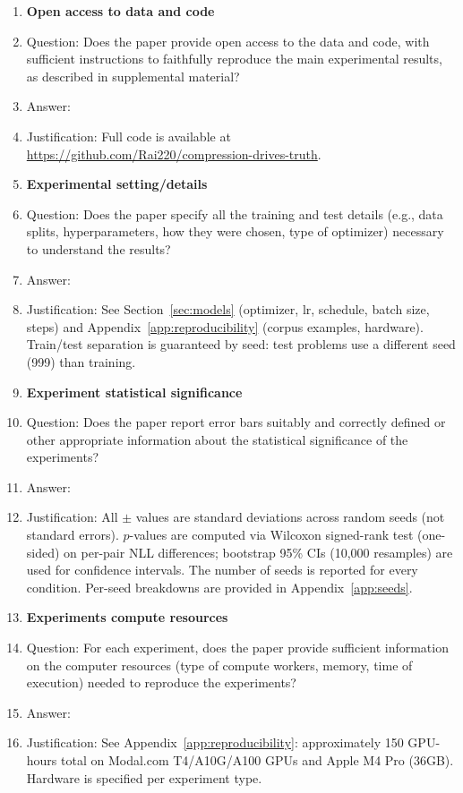 \documentclass{article}
\begin{document}
\begin{enumerate}
\item {\bf Open access to data and code}
    \item[] Question: Does the paper provide open access to the data and code, with sufficient instructions to faithfully reproduce the main experimental results, as described in supplemental material?
    \item[] Answer: \answerYes{}
    \item[] Justification: Full code is available at \url{https://github.com/Rai220/compression-drives-truth}.

\item {\bf Experimental setting/details}
    \item[] Question: Does the paper specify all the training and test details (e.g., data splits, hyperparameters, how they were chosen, type of optimizer) necessary to understand the results?
    \item[] Answer: \answerYes{}
    \item[] Justification: See Section~\ref{sec:models} (optimizer, lr, schedule, batch size, steps) and Appendix~\ref{app:reproducibility} (corpus examples, hardware). Train/test separation is guaranteed by seed: test problems use a different seed (999) than training.

\item {\bf Experiment statistical significance}
    \item[] Question: Does the paper report error bars suitably and correctly defined or other appropriate information about the statistical significance of the experiments?
    \item[] Answer: \answerYes{}
    \item[] Justification: All $\pm$ values are standard deviations across random seeds (not standard errors). $p$-values are computed via Wilcoxon signed-rank test (one-sided) on per-pair NLL differences; bootstrap 95\% CIs (10{,}000 resamples) are used for confidence intervals. The number of seeds is reported for every condition. Per-seed breakdowns are provided in Appendix~\ref{app:seeds}.

\item {\bf Experiments compute resources}
    \item[] Question: For each experiment, does the paper provide sufficient information on the computer resources (type of compute workers, memory, time of execution) needed to reproduce the experiments?
    \item[] Answer: \answerYes{}
    \item[] Justification: See Appendix~\ref{app:reproducibility}: approximately 150 GPU-hours total on Modal.com T4/A10G/A100 GPUs and Apple M4 Pro (36GB). Hardware is specified per experiment type.


\end{enumerate}
\end{document}
